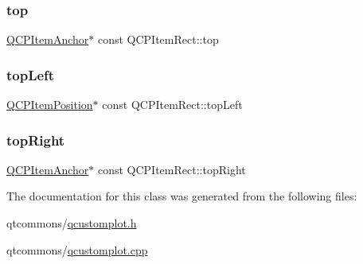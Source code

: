 \subsubsection{\texorpdfstring{top}{top}}
{\footnotesize\ttfamily \mbox{\hyperlink{class_q_c_p_item_anchor}{Q\+C\+P\+Item\+Anchor}}$\ast$ const Q\+C\+P\+Item\+Rect\+::top}

\mbox{\label{class_q_c_p_item_rect_aa70feeef173489b03c3fbe906a5023c4}} 
\subsubsection{\texorpdfstring{topLeft}{topLeft}}
{\footnotesize\ttfamily \mbox{\hyperlink{class_q_c_p_item_position}{Q\+C\+P\+Item\+Position}}$\ast$ const Q\+C\+P\+Item\+Rect\+::top\+Left}

\mbox{\label{class_q_c_p_item_rect_a77e0eb6e4aa6efee620d35e2c21bdad7}} 
\subsubsection{\texorpdfstring{topRight}{topRight}}
{\footnotesize\ttfamily \mbox{\hyperlink{class_q_c_p_item_anchor}{Q\+C\+P\+Item\+Anchor}}$\ast$ const Q\+C\+P\+Item\+Rect\+::top\+Right}



The documentation for this class was generated from the following files\+:\begin{DoxyCompactItemize}
\item 
qtcommons/\mbox{\hyperlink{qcustomplot_8h}{qcustomplot.\+h}}\item 
qtcommons/\mbox{\hyperlink{qcustomplot_8cpp}{qcustomplot.\+cpp}}\end{DoxyCompactItemize}
